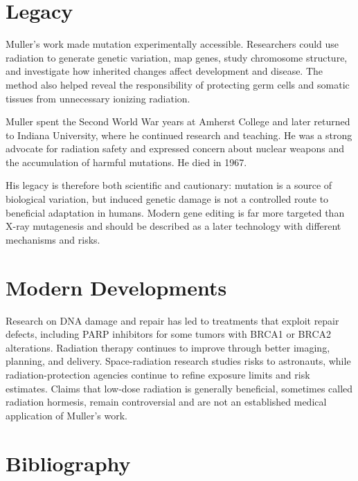 \section{Legacy}

Muller's work made mutation experimentally accessible. Researchers could use radiation to generate genetic variation, map genes, study chromosome structure, and investigate how inherited changes affect development and disease. The method also helped reveal the responsibility of protecting germ cells and somatic tissues from unnecessary ionizing radiation.

Muller spent the Second World War years at Amherst College and later returned to Indiana University, where he continued research and teaching. He was a strong advocate for radiation safety and expressed concern about nuclear weapons and the accumulation of harmful mutations. He died in 1967.

His legacy is therefore both scientific and cautionary: mutation is a source of biological variation, but induced genetic damage is not a controlled route to beneficial adaptation in humans. Modern gene editing is far more targeted than X-ray mutagenesis and should be described as a later technology with different mechanisms and risks.

\section{Modern Developments}

Research on DNA damage and repair has led to treatments that exploit repair defects, including PARP inhibitors for some tumors with BRCA1 or BRCA2 alterations. Radiation therapy continues to improve through better imaging, planning, and delivery. Space-radiation research studies risks to astronauts, while radiation-protection agencies continue to refine exposure limits and risk estimates. Claims that low-dose radiation is generally beneficial, sometimes called radiation hormesis, remain controversial and are not an established medical application of Muller's work.

\section{Bibliography}


